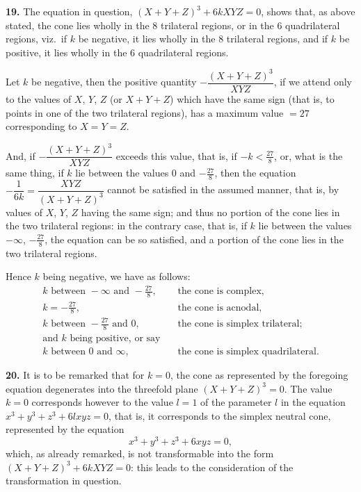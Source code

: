 \documentclass[11pt,a4paper]{article}
\theoremstyle{plain}
\begin{document}
\noindent\textbf{19.} The equation in question, $(X+Y+Z)^3 + 6kXYZ = 0$, shows that, as above stated, the cone lies wholly in the 8 trilateral regions, or in the 6 quadrilateral regions, viz.\ if $k$ be negative, it lies wholly in the 8 trilateral regions, and if $k$ be positive, it lies wholly in the 6 quadrilateral regions.

Let $k$ be negative, then the positive quantity $-\dfrac{(X+Y+Z)^3}{XYZ}$, if we attend only to the values of $X$, $Y$, $Z$ (or $X+Y+Z$) which have the same sign (that is, to points in one of the two trilateral regions), has a maximum value $= 27$ corresponding to $X=Y=Z$.

And, if $-\dfrac{(X+Y+Z)^3}{XYZ}$ exceeds this value, that is, if $-k < \tfrac{27}{8}$, or, what is the same thing, if $k$ lie between the values $0$ and $-\tfrac{27}{8}$, then the equation $-\dfrac{1}{6k} = \dfrac{XYZ}{(X+Y+Z)^3}$ cannot be satisfied in the assumed manner, that is, by values of $X$, $Y$, $Z$ having the same sign; and thus no portion of the cone lies in the two trilateral regions: in the contrary case, that is, if $k$ lie between the values $-\infty$, $-\tfrac{27}{8}$, the equation can be so satisfied, and a portion of the cone lies in the two trilateral regions.

Hence $k$ being negative, we have as follows:
\begin{align*}
k \text{ between } -\infty \text{ and } -\tfrac{27}{8}, &\quad \text{the cone is complex},\\
k = -\tfrac{27}{8}, &\quad \text{the cone is acnodal},\\
k \text{ between } -\tfrac{27}{8} \text{ and } 0, &\quad \text{the cone is simplex trilateral};\\
\text{and } k \text{ being positive, or say}\\
k \text{ between } 0 \text{ and } \infty, &\quad \text{the cone is simplex quadrilateral}.
\end{align*}

\noindent\textbf{20.} It is to be remarked that for $k=0$, the cone as represented by the foregoing equation degenerates into the threefold plane $(X+Y+Z)^3=0$. The value $k=0$ corresponds however to the value $l=1$ of the parameter $l$ in the equation $x^3+y^3+z^3+6lxyz=0$, that is, it corresponds to the simplex neutral cone, represented by the equation
\[
x^3+y^3+z^3+6xyz=0,
\]
which, as already remarked, is not transformable into the form $(X+Y+Z)^3 + 6kXYZ = 0$: this leads to the consideration of the transformation in question.
\end{document}
